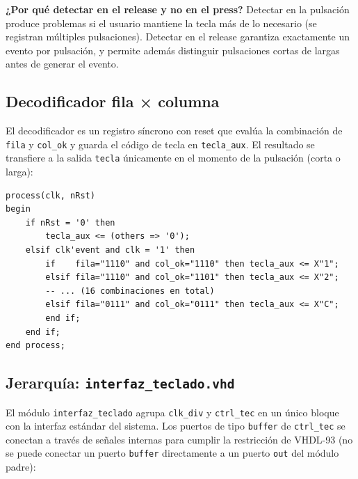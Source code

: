 \documentclass[memoria_final]{subfiles}
\begin{document}
\begin{tcolorbox}[colback=SoftBlue,colframe=MainBlue,boxrule=0.8pt,arc=2pt,
  left=0.5cm,right=0.5cm,top=0.3cm,bottom=0.3cm]
  \small\faInfoCircle\enspace\textbf{¿Por qué detectar en el release y no en
  el press?} Detectar en la pulsación produce problemas si el usuario mantiene
  la tecla más de lo necesario (se registran múltiples pulsaciones). Detectar
  en el release garantiza exactamente un evento por pulsación, y permite
  además distinguir pulsaciones cortas de largas antes de generar el evento.
\end{tcolorbox}

\subsection{Decodificador fila × columna}

El decodificador es un registro síncrono con reset que evalúa la combinación
de \texttt{fila} y \texttt{col\_ok} y guarda el código de tecla en
\texttt{tecla\_aux}. El resultado se transfiere a la salida \texttt{tecla}
únicamente en el momento de la pulsación (corta o larga):

\begin{lstlisting}[caption={Decodificador fila/columna (fragmento) en \texttt{ctrl\_tec.vhd}}]
process(clk, nRst)
begin
    if nRst = '0' then
        tecla_aux <= (others => '0');
    elsif clk'event and clk = '1' then
        if    fila="1110" and col_ok="1110" then tecla_aux <= X"1";
        elsif fila="1110" and col_ok="1101" then tecla_aux <= X"2";
        -- ... (16 combinaciones en total)
        elsif fila="0111" and col_ok="0111" then tecla_aux <= X"C";
        end if;
    end if;
end process;
\end{lstlisting}

\subsection{Jerarquía: \texttt{interfaz\_teclado.vhd}}

El módulo \texttt{interfaz\_teclado} agrupa \texttt{clk\_div} y
\texttt{ctrl\_tec} en un único bloque con la interfaz estándar del sistema.
Los puertos de tipo \texttt{buffer} de \texttt{ctrl\_tec} se conectan a través
de señales internas para cumplir la restricción de VHDL-93 (no se puede
conectar un puerto \texttt{buffer} directamente a un puerto \texttt{out} del
módulo padre):
\end{document}
